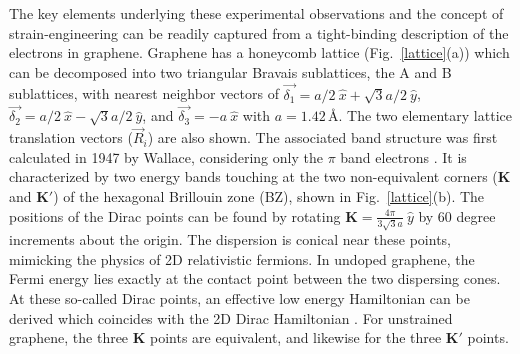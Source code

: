 The key elements underlying these experimental observations and the concept of strain-engineering can be readily captured from a tight-binding description of the electrons in graphene.
Graphene has a honeycomb lattice (Fig.~\ref{lattice}(a)) which can be decomposed into two triangular Bravais sublattices, the A and B sublattices, with nearest neighbor vectors of $\vec{\delta_1}=a/2 \ \hat{x}+\sqrt{3}a/2 \ \hat{y}$, $\vec{\delta_2}=a/2 \ \hat{x}- \sqrt{3}a/2 \ \hat{y}$, and $\vec{\delta_3}=-a \ \hat{x}$ with $a=1.42$\,\AA.
The two elementary lattice translation vectors ($\vec{R}_i$) are also shown.
The associated band structure was first calculated in 1947 by Wallace, considering only the $\pi$ band electrons \cite{Wallace1947}.
It is characterized by two energy bands touching at the two non-equivalent corners ($\bm{K}$ and $\bm{K'}$) of the hexagonal Brillouin zone (BZ)\cite{Wallace1947}, shown in Fig.~\ref{lattice}(b).
The positions of the Dirac points can be found by rotating $\bm{K}=\frac{4 \pi}{3 \sqrt{3} a}\ \hat y$ by 60 degree increments about the origin.
The dispersion is conical near these points,  mimicking the physics of 2D relativistic fermions. 
In undoped graphene, the Fermi energy lies exactly at the contact point between the two dispersing cones.
At these so-called Dirac points, an effective low energy Hamiltonian can be derived which coincides with the 2D Dirac Hamiltonian \cite{Semenoff1984,CastroNeto2009,Ando2005}.
For unstrained graphene, the three $\bm{K}$ points are equivalent, and likewise for the three $\bm{K'}$ points.

